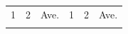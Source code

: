 {\begin{center}
\begin{xtabular*}{\mytablewidth}[t]{|p{10\mystarwidth}|p{10\mystarwidth}|p{10\mystarwidth}|p{10\mystarwidth}|p{10\mystarwidth}|p{10\mystarwidth}|}
        1 &
    
    
        2 &
    
    
        Ave. &
    
    
        1 &
    
    
        2 &
    
    
        Ave.%
     \tabularnewline{}
    
    
         &
    
    
         &
    
    
         &
    
    

\end{xtabular*}
\end{center}}
